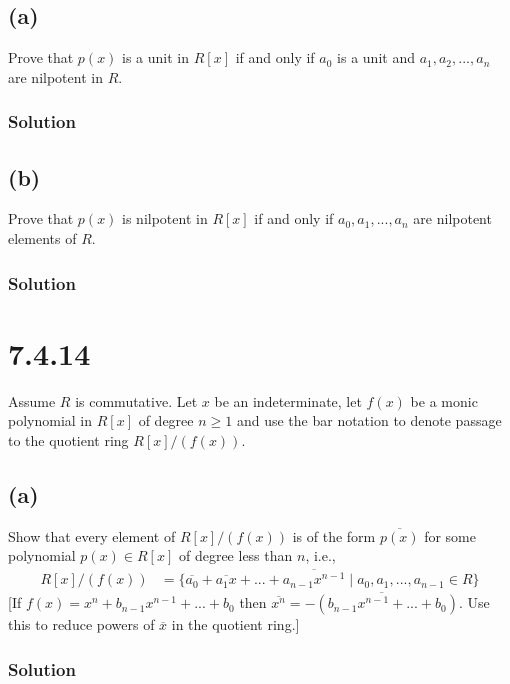 \documentclass[fleqn]{article}
\begin{document}
        \subsection{(a)}
        Prove that $p(x)$ is a unit in $R[x]$ if and only if $a_0$ is a unit and $a_1, a_2, ..., a_n$ are nilpotent in $R$.
            
            \subsubsection{Solution}
            
        
        \subsection{(b)}
        Prove that $p(x)$ is nilpotent in $R[x]$ if and only if $a_0, a_1, ..., a_n$ are nilpotent elements of $R$.
        
            \subsubsection{Solution}
            
    
    \section{7.4.14}
    Assume $R$ is commutative.  Let $x$ be an indeterminate, let $f(x)$ be a monic polynomial in $R[x]$ of degree $n \geq 1$ and use the bar notation to denote passage to the quotient ring $R[x]/(f(x))$.
        
        \subsection{(a)}
        Show that every element of $R[x]/(f(x))$ is of the form $\overline{p(x)}$ for some polynomial $p(x) \in R[x]$ of degree less than $n$, i.e., 
        \begin{align}
            R[x]/(f(x)) &= \{\overline{a_0} + \overline{a_1 x} + ... + \overline{a_{n - 1} x^{n - 1}} \mid a_0, a_1, ..., a_{n - 1} \in R\}
        \end{align}
        [If $f(x) = x^n + b_{n - 1} x^{n - 1} + ... + b_0$ then $\overline{x^n} = \overline{-(b_{n - 1} x^{n - 1} + ... + b_0)}$.  Use this to reduce powers of $\overline{x}$ in the quotient ring.]
            
            \subsubsection{Solution}
            
\end{document}
